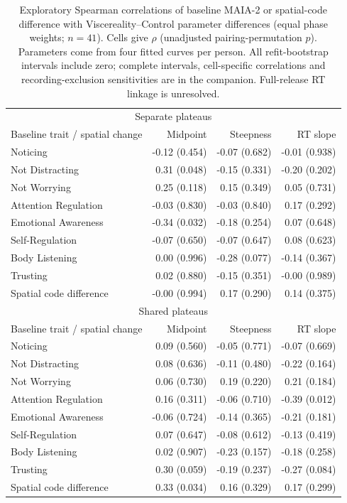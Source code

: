 \begin{table}[htbp]
\centering\small
\begin{tabular}{lrrr}
\multicolumn{4}{c}{Separate plateaus} \\
Baseline trait / spatial change & Midpoint & Steepness & RT slope \\
\hline
Noticing & -0.12 (0.454) & -0.07 (0.682) & -0.01 (0.938) \\
Not Distracting & 0.31 (0.048) & -0.15 (0.331) & -0.20 (0.202) \\
Not Worrying & 0.25 (0.118) & 0.15 (0.349) & 0.05 (0.731) \\
Attention Regulation & -0.03 (0.830) & -0.03 (0.840) & 0.17 (0.292) \\
Emotional Awareness & -0.34 (0.032) & -0.18 (0.254) & 0.07 (0.648) \\
Self-Regulation & -0.07 (0.650) & -0.07 (0.647) & 0.08 (0.623) \\
Body Listening & 0.00 (0.996) & -0.28 (0.077) & -0.14 (0.367) \\
Trusting & 0.02 (0.880) & -0.15 (0.351) & -0.00 (0.989) \\
Spatial code difference & -0.00 (0.994) & 0.17 (0.290) & 0.14 (0.375) \\
\hline
\multicolumn{4}{c}{Shared plateaus} \\
Baseline trait / spatial change & Midpoint & Steepness & RT slope \\
\hline
Noticing & 0.09 (0.560) & -0.05 (0.771) & -0.07 (0.669) \\
Not Distracting & 0.08 (0.636) & -0.11 (0.480) & -0.22 (0.164) \\
Not Worrying & 0.06 (0.730) & 0.19 (0.220) & 0.21 (0.184) \\
Attention Regulation & 0.16 (0.311) & -0.06 (0.710) & -0.39 (0.012) \\
Emotional Awareness & -0.06 (0.724) & -0.14 (0.365) & -0.21 (0.181) \\
Self-Regulation & 0.07 (0.647) & -0.08 (0.612) & -0.13 (0.419) \\
Body Listening & 0.02 (0.907) & -0.23 (0.157) & -0.18 (0.258) \\
Trusting & 0.30 (0.059) & -0.19 (0.237) & -0.27 (0.084) \\
Spatial code difference & 0.33 (0.034) & 0.16 (0.329) & 0.17 (0.299) \\
\end{tabular}
\caption{Exploratory Spearman correlations of baseline MAIA-2 or spatial-code difference with Viscereality--Control parameter differences (equal phase weights; $n=41$). Cells give $\rho$ (unadjusted pairing-permutation $p$). Parameters come from four fitted curves per person. All refit-bootstrap intervals include zero; complete intervals, cell-specific correlations and recording-exclusion sensitivities are in the companion. Full-release RT linkage is unresolved.}
\label{study5:tab:individual_links}
\end{table}

